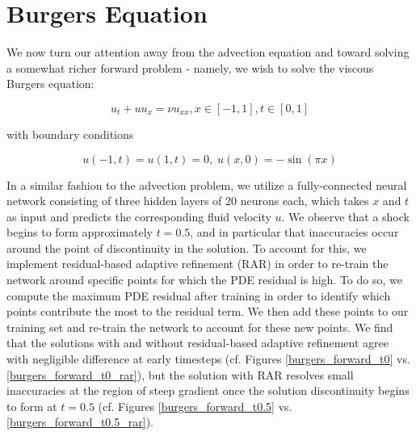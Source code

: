 \documentclass[letterpaper,11pt]{article}
\begin{document}
    \section{Burgers Equation}
    We now turn our attention away from the advection equation and toward solving a somewhat richer forward problem - 
    namely, we wish to solve the viscous Burgers equation:

    $$
    u_t + u u_x = \nu u_{xx}, x \in [-1, 1], t \in [0, 1]
    $$

    \noindent with boundary conditions

    $$
    u(-1, t) = u(1, t) = 0,\; u(x, 0) = -\sin{(\pi x)}
    $$

    In a similar fashion to the advection problem, we utilize a fully-connected neural network consisting of
    three hidden layers of 20 neurons each, which takes $x$ and $t$ as input and predicts the corresponding fluid 
    velocity $u$.  We observe that a shock begins to form approximately $t = 0.5$, and in particular that inaccuracies 
    occur around the point of discontinuity in the solution. To account for this, we implement residual-based adaptive 
    refinement (RAR) in order to re-train the network around specific points for which the PDE residual is 
    high.\cite{WU2023115671} To do so, we compute the maximum PDE residual after training in order to identify which 
    points contribute the most to the residual term. We then add these points to our training set and re-train the 
    network to account for these new points. We find that the solutions with and without residual-based adaptive 
    refinement agree with negligible difference at early timesteps (cf. Figures 
    \ref{burgers_forward_t0} vs. \ref{burgers_forward_t0_rar}), but the solution with RAR resolves small 
    inaccuracies at the region of steep gradient once the solution discontinuity begins to form at $t = 0.5$ 
    (cf. Figures \ref{burgers_forward_t0.5} vs. \ref{burgers_forward_t0.5_rar}).
\end{document}
